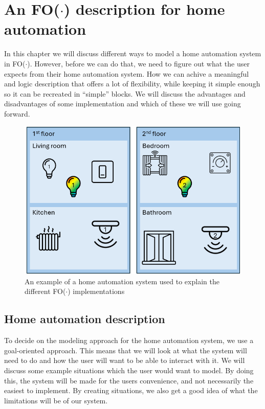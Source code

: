 \documentclass[11pt,a4paper]{report}
\newcommand{\fodot}{FO($\cdot$)\xspace}
\begin{document}
\chapter{An \fodot description for home automation}
\label{home_automation_and_fodot}
In this chapter we will discuss different ways to model a home automation system in \fodot. However, before we can do that, we need to figure out what the user expects from their home automation system. How we can achive a meaningful and logic description that offers a lot of flexibility, while keeping it simple enough so it can be recreated in ``simple'' blocks. We will discuss the advantages and disadvantages of some implementation and which of these we will use going forward.
\begin{figure}
    \centering
    \includegraphics[width=0.8\linewidth]{images/fodot-structure_example.png}
    \caption{An example of a home automation system used to explain the different \fodot implementations}
    \label{fig:fodot-structure_example}
\end{figure}

\section{Home automation description}
To decide on the modeling approach for the home automation system, we use a goal-oriented approach. This means that we will look at what the system will need to do and how the user will want to be able to interact with it. We will discuss some example situations which the user would want to model. By doing this, the system will be made for the users convenience, and not necessarily the easiest to implement. By creating situations, we also get a good idea of what the limitations will be of our system. 
\end{document}
